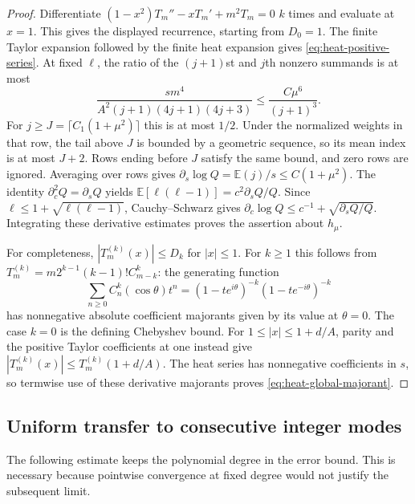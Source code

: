 \begin{proof}
Differentiate $(1-x^2)T_m''-xT_m'+m^2T_m=0$ $k$ times and evaluate
at $x=1$.  This gives the displayed recurrence, starting from $D_0=1$.
The finite Taylor expansion followed by the finite heat expansion gives
\eqref{eq:heat-positive-series}.  At fixed $\ell$, the ratio of the
$(j+1)$st and $j$th nonzero summands is at most
\[
 \frac{s m^4}{A^2(j+1)(4j+1)(4j+3)}
 \le\frac{C\mu^6}{(j+1)^3}.
\]
For $j\ge J=\lceil C_1(1+\mu^2)\rceil$ this is at most $1/2$.
Under the normalized weights in that row, the tail above $J$ is bounded
by a geometric sequence, so its mean index is at most $J+2$.
Rows ending before $J$ satisfy the same bound, and zero rows are ignored.
Averaging over rows gives
$\partial_s\log Q=\mathbb E(j)/s\le C(1+\mu^2)$.
The identity $\partial_c^2Q=\partial_sQ$ yields
$\mathbb E[\ell(\ell-1)]=c^2\partial_sQ/Q$.
Since $\ell\le1+\sqrt{\ell(\ell-1)}$, Cauchy--Schwarz gives
$\partial_c\log Q\le c^{-1}+\sqrt{\partial_sQ/Q}$.
Integrating these derivative estimates proves the assertion about
$h_\mu$.

For completeness, $|T_m^{(k)}(x)|\le D_k$ for $|x|\le1$.
For $k\ge1$ this follows from
$T_m^{(k)}=m2^{k-1}(k-1)!C_{m-k}^{k}$: the generating function
\[
 \sum_{n\ge0}C_n^k(\cos\theta)t^n
 =(1-te^{i\theta})^{-k}(1-te^{-i\theta})^{-k}
\]
has nonnegative absolute coefficient majorants given by its value at
$\theta=0$.  The case $k=0$ is the defining Chebyshev bound.
For $1\le|x|\le1+d/A$, parity and the positive Taylor coefficients at
one instead give
$|T_m^{(k)}(x)|\le T_m^{(k)}(1+d/A)$.
The heat series has nonnegative coefficients in $s$, so termwise use of
these derivative majorants proves \eqref{eq:heat-global-majorant}.
\end{proof}

\subsection{Uniform transfer to consecutive integer modes}

The following estimate keeps the polynomial degree in the error bound.
This is necessary because pointwise convergence at fixed degree would
not justify the subsequent limit.

